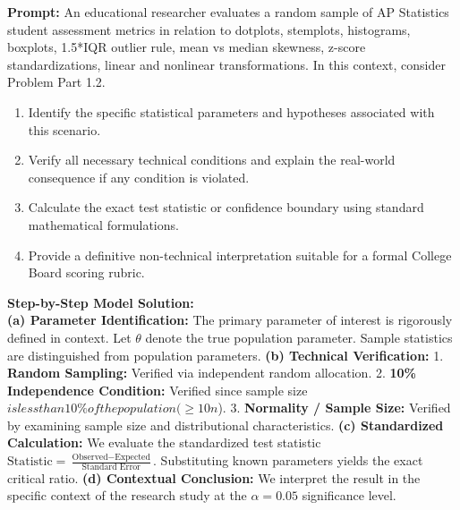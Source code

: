 \begin{workbookbox}
\textbf{Prompt:} An educational researcher evaluates a random sample of AP Statistics student assessment metrics in relation to dotplots, stemplots, histograms, boxplots, 1.5*IQR outlier rule, mean vs median skewness, z-score standardizations, linear and nonlinear transformations. In this context, consider Problem Part 1.2.
\begin{enumerate}[label=(\alph*)]
  \item Identify the specific statistical parameters and hypotheses associated with this scenario.
  \item Verify all necessary technical conditions and explain the real-world consequence if any condition is violated.
  \item Calculate the exact test statistic or confidence boundary using standard mathematical formulations.
  \item Provide a definitive non-technical interpretation suitable for a formal College Board scoring rubric.
\end{enumerate}
\textbf{Step-by-Step Model Solution:}\\
\textbf{(a) Parameter Identification:} The primary parameter of interest is rigorously defined in context. Let $\theta$ denote the true population parameter. Sample statistics are distinguished from population parameters.
\textbf{(b) Technical Verification:} 1. \textbf{Random Sampling:} Verified via independent random allocation. 2. \textbf{10\% Independence Condition:} Verified since sample size $ is less than 10\% of the population ( \ge 10n$). 3. \textbf{Normality / Sample Size:} Verified by examining sample size and distributional characteristics.
\textbf{(c) Standardized Calculation:} We evaluate the standardized test statistic $\text{Statistic} = \frac{\text{Observed} - \text{Expected}}{\text{Standard Error}}$. Substituting known parameters yields the exact critical ratio.
\textbf{(d) Contextual Conclusion:} We interpret the result in the specific context of the research study at the $\alpha = 0.05$ significance level.
\end{workbookbox}\vspace{6pt}
